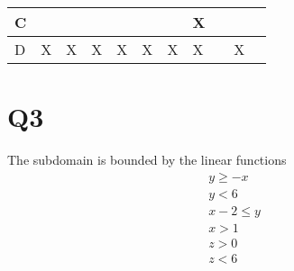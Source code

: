 \documentclass[12pt, letterpaper, titlepage]{article}
\begin{document}
\begin{enumerate}
\begin{tabular}{|l|l|l|l|l|l|l|l|l|l|l|}
        C                                                   &               &   &               &               &                                                                             &                                                                             & X                                                                           &                  &                  &                  \\ \hline
        D                                                   & X             & X & X             & X             & X                                                                           & X                                                                           & X                                                                           &                  & X                &                  \\ \hline
        \end{tabular}
\end{enumerate}
\section{Q3}
The subdomain is bounded by the linear functions
\begin{align}
    y \geq -x \\
    y < 6 \\ 
    x-2 \leq y \\
    x  > 1 \\
    z > 0 \\
    z < 6 \\
\end{align}
\end{document}
